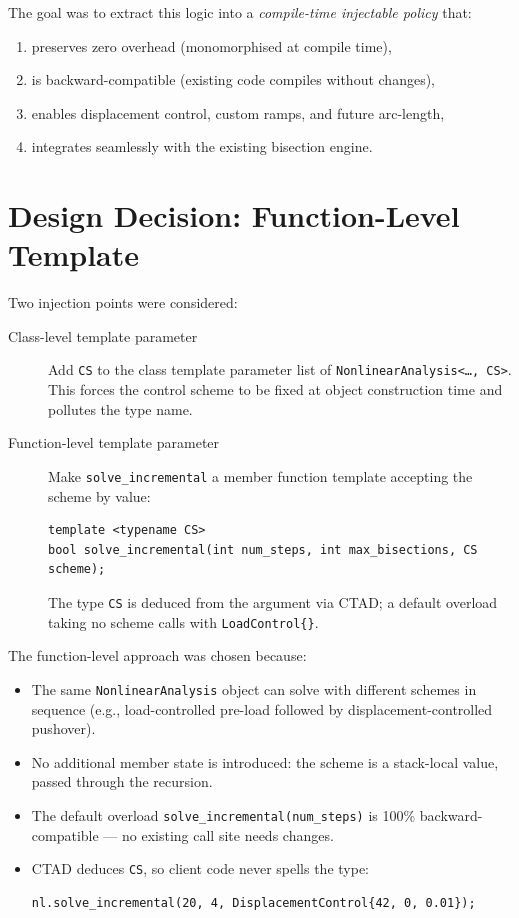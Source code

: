 The goal was to extract this logic into a \emph{compile-time injectable
policy} that:
\begin{enumerate}[label=(\roman*)]
  \item preserves zero overhead (monomorphised at compile time),
  \item is backward-compatible (existing code compiles without changes),
  \item enables displacement control, custom ramps, and future arc-length,
  \item integrates seamlessly with the existing bisection engine.
\end{enumerate}

\section{Design Decision: Function-Level Template}
\label{sec:ic-design}

Two injection points were considered:

\begin{description}
  \item[Class-level template parameter] Add \texttt{CS} to the class template
        parameter list of \texttt{NonlinearAnalysis<\ldots, CS>}.  This forces
        the control scheme to be fixed at object construction time and pollutes
        the type name.

  \item[Function-level template parameter] Make \texttt{solve\_incremental}
        a member function template accepting the scheme by value:
        \begin{lstlisting}
template <typename CS>
bool solve_incremental(int num_steps, int max_bisections, CS scheme);
        \end{lstlisting}
        The type \texttt{CS} is deduced from the argument via CTAD; a
        default overload taking no scheme calls with \texttt{LoadControl\{\}}.
\end{description}

The function-level approach was chosen because:

\begin{itemize}
  \item The same \texttt{NonlinearAnalysis} object can solve with
        different schemes in sequence (e.g., load-controlled pre-load
        followed by displacement-controlled pushover).
  \item No additional member state is introduced: the scheme is a
        stack-local value, passed through the recursion.
  \item The default overload \texttt{solve\_incremental(num\_steps)} is
        100\% backward-compatible — no existing call site needs changes.
  \item CTAD deduces \texttt{CS}, so client code never spells the type:
        \begin{lstlisting}
nl.solve_incremental(20, 4, DisplacementControl{42, 0, 0.01});
        \end{lstlisting}
\end{itemize}

